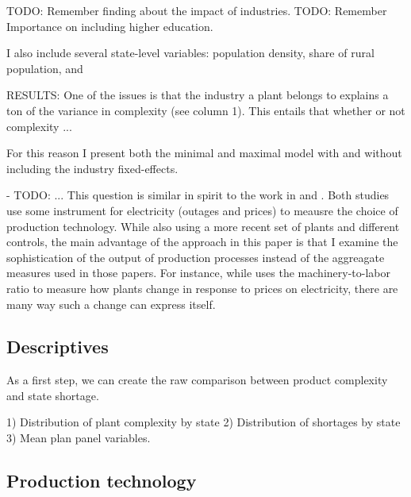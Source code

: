\documentclass[11pt]{article}
\begin{document}
TODO: Remember finding about the impact of industries.
TODO: Remember Importance on including higher education.

I also include several state-level variables: population density, share of rural population, and 


RESULTS: One of the issues is that the industry a plant belongs to explains a ton of the variance in complexity (see column 1). This entails that whether or not complexity ...

For this reason I present both the minimal and maximal model with and without including the industry fixed-effects.


- TODO: ... This question is similar in spirit to the work in \cite{allcott_how_2016} and \cite{abeberese_electricity_2017}. Both studies use some instrument for electricity (outages and prices) to meausre the choice of production technology. While also using a more recent set of plants and different controls, the main advantage of the approach in this paper is that I examine the sophistication of the output of production processes instead of the aggreagate measures used in those papers. For instance, while \cite{abeberese_electricity_2017} uses the machinery-to-labor ratio to measure how plants change in response to prices on electricity, there are many way such a change can express itself. 

\subsection{Descriptives}%
\label{sub:descriptives}

As a first step, we can create the raw comparison between product complexity and state shortage.

1) Distribution of plant complexity by state
2) Distribution of shortages by state
3) Mean plan panel variables.

\subsection{Production technology}%
\label{sub:production_technology}


\newpage

\end{document}
